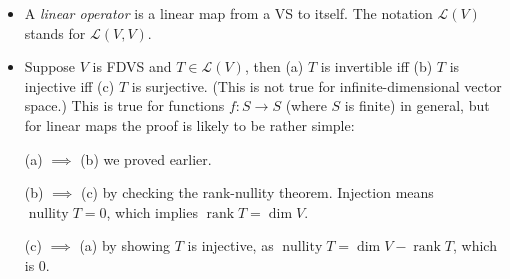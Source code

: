 \documentclass{article}
\renewcommand{\d}{\dim}
\newcommand{\LV}{\mathcal{L}(V)}
\begin{document}
\begin{itemize}
\begin{itemize}
    \end{itemize}
    \item A \textit{linear operator} is a linear map from a VS to itself. The notation $\LV$ stands for $\mathcal{L}(V,V)$.
    \item Suppose $V$ is FDVS and $T \in \LV$, then (a) $T$ is invertible iff (b) $T$ is injective iff (c) $T$ is surjective. (This is not true for infinite-dimensional vector space.) This is true for functions $f:S \to S$ (where $S$ is finite) in general, but for linear maps the proof is likely to be rather simple:
        
    (a) $\implies$ (b) we proved earlier.
        
    (b) $\implies$ (c) by checking the rank-nullity theorem. Injection means $\operatorname{nullity} T = 0$, which implies $\operatorname{rank} T = \d V$.
        
    (c) $\implies$ (a) by showing $T$ is injective, as $\operatorname{nullity} T = \d V - \operatorname{rank} T$, which is 0.
\end{itemize}
\end{document}
